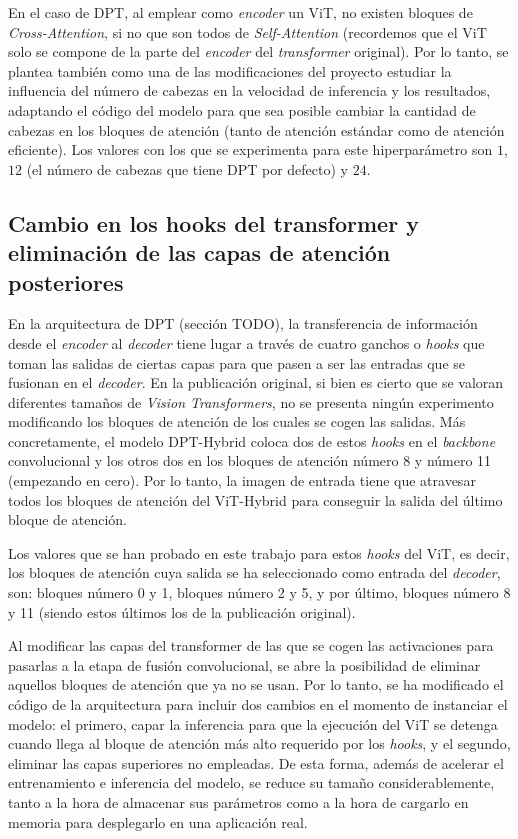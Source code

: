 En el caso de DPT, al emplear como \textit{encoder} un ViT, no existen bloques de \textit{Cross-Attention}, si no que son todos de \textit{Self-Attention} (recordemos que el ViT solo se compone de la parte del \textit{encoder} del \textit{transformer} original). Por lo tanto, se plantea también como una de las modificaciones del proyecto estudiar la influencia del número de cabezas en la velocidad de inferencia y los resultados, adaptando el código del modelo para que sea posible cambiar la cantidad de cabezas en los bloques de atención (tanto de atención estándar como de atención eficiente). Los valores con los que se experimenta para este hiperparámetro son $1$, $12$ (el número de cabezas que tiene DPT por defecto) y $24$.

\subsection{Cambio en los hooks del transformer y eliminación de las capas de atención posteriores}

En la arquitectura de DPT (sección TODO), la transferencia de información desde el \textit{encoder} al \textit{decoder} tiene lugar a través de cuatro ganchos o \textit{hooks} que toman las salidas de ciertas capas para que pasen a ser las entradas que se fusionan en el \textit{decoder}. En la publicación original, si bien es cierto que se valoran diferentes tamaños de \textit{Vision Transformers}, no se presenta ningún experimento modificando los bloques de atención de los cuales se cogen las salidas. Más concretamente, el modelo DPT-Hybrid coloca dos de estos \textit{hooks} en el \textit{backbone} convolucional y los otros dos en los bloques de atención número 8 y número 11 (empezando en cero). Por lo tanto, la imagen de entrada tiene que atravesar todos los bloques de atención del ViT-Hybrid para conseguir la salida del último bloque de atención.

Los valores que se han probado en este trabajo para estos \textit{hooks} del ViT, es decir, los bloques de atención cuya salida se ha seleccionado como entrada del \textit{decoder}, son: bloques número 0 y 1, bloques número 2 y 5, y por último, bloques número 8 y 11 (siendo estos últimos los de la publicación original).

Al modificar las capas del transformer de las que se cogen las activaciones para pasarlas a la etapa de fusión convolucional, se abre la posibilidad de eliminar aquellos bloques de atención que ya no se usan. Por lo tanto, se ha modificado el código de la arquitectura para incluir dos cambios en el momento de instanciar el modelo: el primero, capar la inferencia para que la ejecución del ViT se detenga cuando llega al bloque de atención más alto requerido por los \textit{hooks}, y el segundo, eliminar las capas superiores no empleadas. De esta forma, además de acelerar el entrenamiento e inferencia del modelo, se reduce su tamaño considerablemente, tanto a la hora de almacenar sus parámetros como a la hora de cargarlo en memoria para desplegarlo en una aplicación real. 

